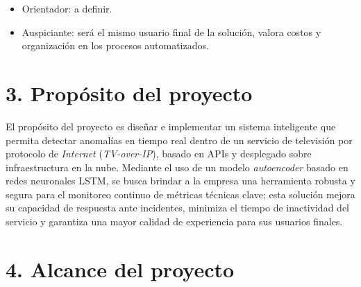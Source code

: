 \documentclass[
11pt, %
]{charter}
\begin{document}
\begin{itemize}
	\item Orientador: a definir.
	\item Auspiciante: será el mismo usuario final de la solución, valora costos y organización en los procesos automatizados. 
\end{itemize}


\section{3. Propósito del proyecto}
\label{sec:proposito}
El propósito del proyecto es diseñar e implementar un sistema inteligente que permita detectar anomalías en tiempo real dentro de un servicio de televisión por protocolo de \textit{Internet} (\textit{TV-over-IP}), basado en APIs y desplegado sobre infraestructura en la nube. Mediante el uso de un modelo \textit{autoencoder} basado en redes neuronales LSTM, se busca brindar a la empresa una herramienta robusta y segura para el monitoreo continuo de métricas técnicas clave; esta solución mejora su capacidad de respuesta ante incidentes, minimiza el tiempo de inactividad del servicio y garantiza una mayor calidad de experiencia para sus usuarios finales. 

\section{4. Alcance del proyecto}
\label{sec:alcance}
\end{document}
